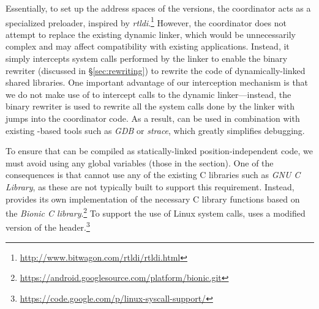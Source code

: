 
  Essentially, to set up the address spaces of
the versions, the coordinator acts as a specialized preloader, inspired
by
\emph{rtldi}.\footnote{\url{http://www.bitwagon.com/rtldi/rtldi.html}}
However, the coordinator does not attempt to replace the existing
dynamic linker, which would be unnecessarily complex and may affect
compatibility with existing applications. Instead, it simply intercepts
system calls performed by the linker to enable the binary rewriter
(discussed in \S\ref{sec:rewriting}) to rewrite the code of
dynamically-linked shared libraries.  One important advantage of our
interception mechanism is that we do not make use of \ptrace to
intercept calls to the dynamic linker---instead, the binary rewriter is
used to rewrite all the system calls done by the linker with jumps into
the coordinator code.  As a result, \nx can be used in combination with
existing -based tools such as \textit{GDB} or
\textit{strace}, which greatly simplifies debugging.




 To ensure that \nx can be compiled as
statically-linked position-independent code, we must avoid using any
global variables (\ie those in the  section). One of the
consequences is that \nx cannot use any of the existing C libraries such
as \textit{GNU C Library}, as these are not typically built to support
this requirement.  Instead, \nx provides its own implementation of the
necessary C library functions based on the \textit{Bionic C
library}.\footnote{\url{https://android.googlesource.com/platform/bionic.git}}
To support the use of Linux system calls, \nx uses a modified version of
the 
header.\footnote{\url{https://code.google.com/p/linux-syscall-support/}}



